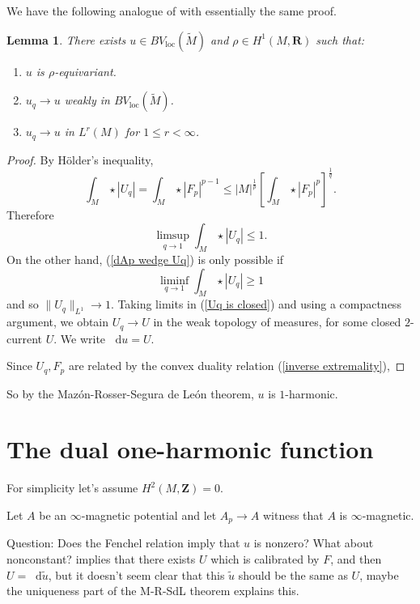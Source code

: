 \documentclass[reqno,11pt]{amsart}
\newcommand{\ZZ}{\mathbf{Z}}
\newcommand{\RR}{\mathbf{R}}
\newcommand*\dif{\mathop{}\!\mathrm{d}}
\newcommand{\loc}{\mathrm{loc}}
\newtheorem{lemma}[theorem]{Lemma}
\theoremstyle{definition}
\numberwithin{equation}{section}
\begin{document}
We have the following analogue of \cite[Theorem 4.3]{daskalopoulos2020transverse} with essentially the same proof.

\begin{lemma}
There exists $u \in BV_\loc(\tilde M)$ and $\rho \in H^1(M, \RR)$ such that:
\begin{enumerate}
\item $u$ is $\rho$-equivariant.
\item $u_q \to u$ weakly in $BV_\loc(\tilde M)$.
\item $u_q \to u$ in $L^r(M)$ for $1 \leq r < \infty$.
\end{enumerate}
\end{lemma}
\begin{proof}
By H\"older's inequality,
$$\int_M \star |U_q| = \int_M \star |F_p|^{p - 1} \leq |M|^{\frac{1}{p}} \left[\int_M \star |F_p|^p\right]^{\frac{1}{q}}.$$
Therefore 
$$\limsup_{q \to 1} \int_M \star |U_q| \leq 1.$$
On the other hand, (\ref{dAp wedge Uq}) is only possible if
$$\liminf_{q \to 1} \int_M \star |U_q| \geq 1$$
and so $\|U_q\|_{L^1} \to 1$.
Taking limits in (\ref{Uq is closed}) and using a compactness argument, we obtain $U_q \to U$ in the weak topology of measures, for some closed $2$-current $U$.
We write $\dif u = U$.

Since $U_q, F_p$ are related by the convex duality relation (\ref{inverse extremality}),
\end{proof}



So by the Maz\'on-Rosser-Segura de Le\'on theorem, $u$ is $1$-harmonic.

\appendix 

\section{The dual one-harmonic function}
For simplicity let's assume $H^2(M, \ZZ) = 0$.

Let $A$ be an $\infty$-magnetic potential and let $A_p \to A$ witness that $A$ is $\infty$-magnetic.


Question: Does the Fenchel relation imply that $u$ is nonzero?
What about nonconstant?
\cite{bangert_cui_2017} implies that there exists $U$ which is calibrated by $F$, and then $U = \dif \tilde u$, but it doesn't seem clear that this $\tilde u$ should be the same as $U$, maybe the uniqueness part of the M-R-SdL theorem explains this.
\end{document}
